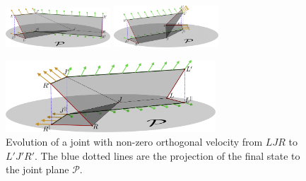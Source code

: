 \begin{figure}
\vspace*{-1.5em}
\graphicspath{{figures/trapezoidZ}}
    \centering
        \includegraphics[width=0.35\textwidth]{figures/trapezoidZ/trapezoidZ0.pdf}%
        \includegraphics[width=0.35\textwidth]{figures/trapezoidZ/trapezoidZ1.pdf}%

        \includegraphics[width=0.7\textwidth]{figures/trapezoidZ/trapezoidZ2.pdf}%
    \caption{
    Evolution of a joint with non-zero orthogonal velocity from $LJR$ to $L'J'R'$.
    The blue dotted lines are the projection of the final state to the joint plane $\mathcal P$.
    }
    \label{fig:trapezoidZ}
\end{figure}
